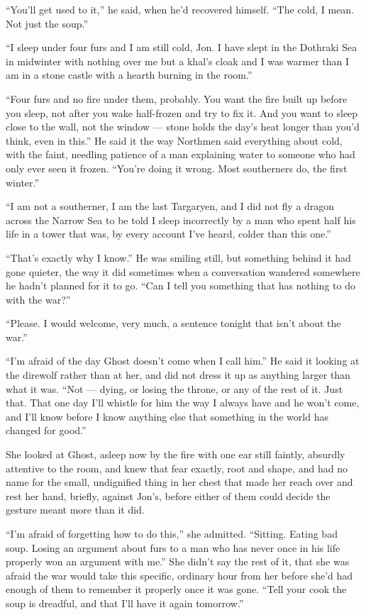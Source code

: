 “You’ll get used to it,” he said, when he’d recovered himself. “The cold, I mean. Not just the soup.”

“I sleep under four furs and I am still cold, Jon. I have slept in the Dothraki Sea in midwinter with nothing over me but a khal’s cloak and I was warmer than I am in a stone castle with a hearth burning in the room.”

“Four furs and no fire under them, probably. You want the fire built up before you sleep, not after you wake half-frozen and try to fix it. And you want to sleep close to the wall, not the window — stone holds the day’s heat longer than you’d think, even in this.” He said it the way Northmen said everything about cold, with the faint, needling patience of a man explaining water to someone who had only ever seen it frozen. “You’re doing it wrong. Most southerners do, the first winter.”

“I am not a southerner, I am the last Targaryen, and I did not fly a dragon across the Narrow Sea to be told I sleep incorrectly by a man who spent half his life in a tower that was, by every account I’ve heard, colder than this one.”

“That’s exactly why I know.” He was smiling still, but something behind it had gone quieter, the way it did sometimes when a conversation wandered somewhere he hadn’t planned for it to go. “Can I tell you something that has nothing to do with the war?”

“Please. I would welcome, very much, a sentence tonight that isn’t about the war.”

“I’m afraid of the day Ghost doesn’t come when I call him.” He said it looking at the direwolf rather than at her, and did not dress it up as anything larger than what it was. “Not — dying, or losing the throne, or any of the rest of it. Just that. That one day I’ll whistle for him the way I always have and he won’t come, and I’ll know before I know anything else that something in the world has changed for good.”

She looked at Ghost, asleep now by the fire with one ear still faintly, absurdly attentive to the room, and knew that fear exactly, root and shape, and had no name for the small, undignified thing in her chest that made her reach over and rest her hand, briefly, against Jon’s, before either of them could decide the gesture meant more than it did.

“I’m afraid of forgetting how to do this,” she admitted. “Sitting. Eating bad soup. Losing an argument about furs to a man who has never once in his life properly won an argument with me.” She didn’t say the rest of it, that she was afraid the war would take this specific, ordinary hour from her before she’d had enough of them to remember it properly once it was gone. “Tell your cook the soup is dreadful, and that I’ll have it again tomorrow.”